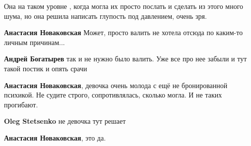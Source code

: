 \begin{itemize}
Она на таком уровне , когда могла их просто послать и сделать из этого много
шума, но она решила написать глупость под давлением, очень зря.

\begin{itemize}
 
\textbf{Анастасия Новаковская} Может, просто валить не хотела отсюда по каким-то личным причинам...

 
\textbf{Андрей Богатырев} так и не нужно было валить. Уже все про нее забыли и тут такой постик и опять срачи

 
\textbf{Анастасия Новаковская}, девочка очень молода с ещё не бронированной психикой. Не судите строго, сопротивлялась, сколько могла. И не таких прогибают.

 
\textbf{Oleg Stetsenko} не девочка тут решает

 
\textbf{Анастасия Новаковская}, это да.

 

\end{itemize}
\end{itemize}
